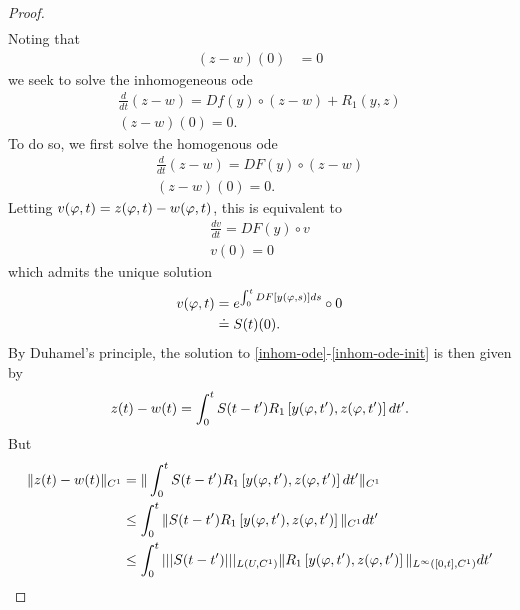 \begin{proof}
\begin{equation*}
\begin{split}
\end{split}
\end{equation*}
%
%
Noting that %
%
\begin{equation*}
\begin{split}
  (z-w)(0) & = 0
\end{split}
\end{equation*}
%
%
we seek to solve the inhomogeneous ode
%
%
\begin{gather}
  \frac{d}{dt}(z-w)  = Df(y) \circ (z-w) + R_{1}(y,z)
\label{inhom-ode}
  \\
  (z-w)(0) = 0.
  \label{inhom-ode-init}
\end{gather}
%
%
To do so, we first solve the homogenous ode
\begin{gather}
  \frac{d}{dt}(z-w)  = DF(y) \circ (z-w) 
\label{hom-ode}
  \\
  (z-w)(0) = 0.
  \label{hom-ode-init}
\end{gather}
Letting $v(\varphi,t) = z(\varphi,t) - w(\varphi,t)$, this is equivalent to
%
%
%
\begin{gather*}
  \frac{dv}{dt}  = DF(y) \circ v
  \\
  v(0) = 0
\end{gather*}
which admits the unique solution
%
%
\begin{equation*}
\begin{split}
  v(\varphi,t) 
  & = e^{\int_{0}^{t} DF\left[ y(\varphi,s) \right]ds} \circ 0
  \\
  & \doteq S(t)(0).
\end{split}
\end{equation*}
%
%
By Duhamel's principle, the solution to \eqref{inhom-ode}-\eqref{inhom-ode-init}
is then given by
%
%
\begin{equation*}
\begin{split}
  z(t) - w(t) = \int_{0}^{t} S(t-t') R_{1}\left[ y(\varphi,t'), z(\varphi,t') \right]dt'.
\end{split}
\end{equation*}
%
%
But
%
%
\begin{equation}
  \label{yui}
\begin{split}
  \|z(t) - w(t) \|_{C^{1}}
  & = \| \int_{0}^{t} S(t-t') R_{1}\left[ y(\vp,t'), z(\vp,t')
  \right]dt' \|_{C^{1}}
  \\
  & \le \int_{0}^{t} \| S(t-t') R_{1}\left[ y(\vp,t'), z(\vp,t') \right]
  \|_{C^{1}} dt'
  \\
  & \le \int_{0}^{t}  | | | S(t-t')  | | |_{L(U, C^{1})} \| R_{1}\left[ y(\vp,t'),
  z(\vp,t')
  \right] \|_{L^{\infty}\left( [0,t], C^{1} \right)} dt'

\end{split}
\end{equation}
\end{proof}
